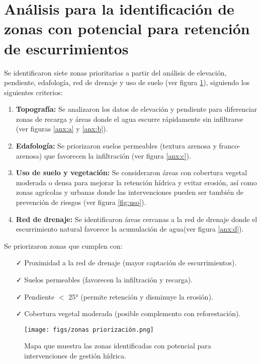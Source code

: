 \documentclass[12pt,letterpaper]{article}
\begin{document}
\section{Análisis para la identificación de zonas con potencial para retención de escurrimientos}

Se identificaron siete zonas prioritarias a partir del análisis de elevación, pendiente, edafología, red de drenaje y uso de suelo (ver figura \ref{fig:zon}), siguiendo los siguientes criterios: 

\begin{enumerate}
    \item \textbf{Topografía:} Se analizaron los datos de elevación y pendiente para diferenciar zonas de recarga y áreas donde el agua escurre rápidamente sin infiltrarse (ver figuras \ref{anx:a} y \ref{anx:b}).
    \item \textbf{Edafología:} Se priorizaron suelos permeables (textura arenosa y franco-arenosa) que favorecen la infiltración (ver figura \ref{anx:c}).
    \item \textbf{Uso de suelo y vegetación:} Se consideraron áreas con cobertura vegetal moderada o densa para mejorar la retención hídrica y evitar erosión, así como zonas agrícolas y urbanas donde las intervenciones pueden ser también de prevención de riesgos (ver figura \ref{fig:uso}).
    \item \textbf{Red de drenaje:} Se identificaron áreas cercanas a la red de drenaje donde el escurrimiento natural favorece la acumulación de agua(ver figura \ref{anx:d}).
\end{enumerate}
Se priorizaron zonas que cumplen con:
\begin{itemize}
    \item[\faCheck] Proximidad a la red de drenaje (mayor captación de escurrimientos).
    \item[\faCheck] Suelos permeables (favorecen la infiltración y recarga).
    \item[\faCheck] Pendiente $<$ 25° (permite retención y disminuye la erosión).
    \item[\faCheck] Cobertura vegetal moderada (posible complemento con reforestación).
\end{itemize}

\begin{figure}[H]
    \centering
    \texttt{[image: figs/zonas priorización.png]}
    \caption{Mapa que muestra las zonas identificadas con potencial para intervenciones de gestión hídrica.}
    \label{fig:zon}
\end{figure}
\end{document}
